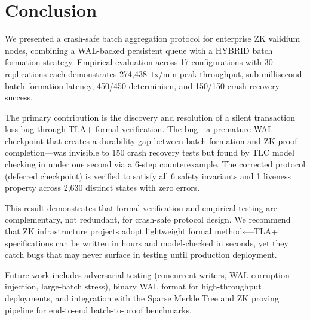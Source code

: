 
\section{Conclusion}

We presented a crash-safe batch aggregation protocol for enterprise ZK validium
nodes, combining a WAL-backed persistent queue with a HYBRID batch formation
strategy. Empirical evaluation across 17 configurations with 30 replications
each demonstrates 274,438~tx/min peak throughput, sub-millisecond batch
formation latency, 450/450 determinism, and 150/150 crash recovery success.

The primary contribution is the discovery and resolution of a silent transaction
loss bug through TLA+ formal verification. The bug---a premature WAL checkpoint
that creates a durability gap between batch formation and ZK proof
completion---was invisible to 150 crash recovery tests but found by TLC model
checking in under one second via a 6-step counterexample. The corrected protocol
(deferred checkpoint) is verified to satisfy all 6 safety invariants and 1
liveness property across 2,630 distinct states with zero errors.

This result demonstrates that formal verification and empirical testing are
complementary, not redundant, for crash-safe protocol design. We recommend that
ZK infrastructure projects adopt lightweight formal methods---TLA+ specifications
can be written in hours and model-checked in seconds, yet they catch bugs that
may never surface in testing until production deployment.

Future work includes adversarial testing (concurrent writers, WAL corruption
injection, large-batch stress), binary WAL format for high-throughput
deployments, and integration with the Sparse Merkle Tree and ZK proving
pipeline for end-to-end batch-to-proof benchmarks.
